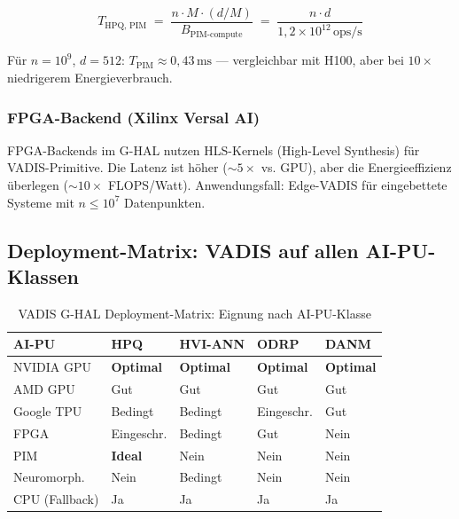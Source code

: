 ﻿\documentclass[12pt,a4paper]{article}
\begin{document}
\begin{equation}
  T_{\text{HPQ, PIM}} \;=\;
  \frac{n \cdot M \cdot (d/M)}{B_{\text{PIM-compute}}}
  \;=\; \frac{n \cdot d}{1{,}2 \times 10^{12}\,\text{ops/s}}
\end{equation}

Für $n = 10^9$, $d = 512$: $T_{\text{PIM}} \approx 0{,}43\,\text{ms}$ ---
vergleichbar mit H100, aber bei $10\times$ niedrigerem Energieverbrauch.

\subsubsection{FPGA-Backend (Xilinx Versal AI)}

FPGA-Backends im G-HAL nutzen HLS-Kernels (High-Level Synthesis)
für VADIS-Primitive. Die Latenz ist höher ($\sim 5\times$ vs. GPU),
aber die Energieeffizienz überlegen ($\sim 10\times$ FLOPS/Watt).
Anwendungsfall: Edge-VADIS für eingebettete Systeme mit
$n \leq 10^7$ Datenpunkten.

\subsection{Deployment-Matrix: VADIS auf allen AI-PU-Klassen}
\label{sub:deployment_matrix}

\begin{table}[ht]
\centering
\small
\caption{VADIS G-HAL Deployment-Matrix: Eignung nach AI-PU-Klasse}
\label{tab:deployment}
\begin{tabular}{@{}p{1.8cm}p{1.5cm}p{1.5cm}p{1.5cm}p{1.5cm}@{}}
\toprule
\textbf{AI-PU} & \textbf{HPQ} & \textbf{HVI-ANN} & \textbf{ODRP} & \textbf{DANM} \\
\midrule
NVIDIA GPU & \textcolor{nvidiaGreen}{\textbf{Optimal}} & \textcolor{nvidiaGreen}{\textbf{Optimal}} & \textcolor{nvidiaGreen}{\textbf{Optimal}} & \textcolor{nvidiaGreen}{\textbf{Optimal}} \\
AMD GPU & Gut & Gut & Gut & Gut \\
Google TPU & Bedingt & Bedingt & Eingeschr. & Gut \\
FPGA & Eingeschr. & Bedingt & Gut & Nein \\
PIM & \textcolor{nvidiaGreen}{\textbf{Ideal}} & Nein & Nein & Nein \\
Neuromorph. & Nein & Bedingt & Nein & Nein \\
CPU (Fallback) & Ja & Ja & Ja & Ja \\
\bottomrule
\end{tabular}
\end{table}
\end{document}
